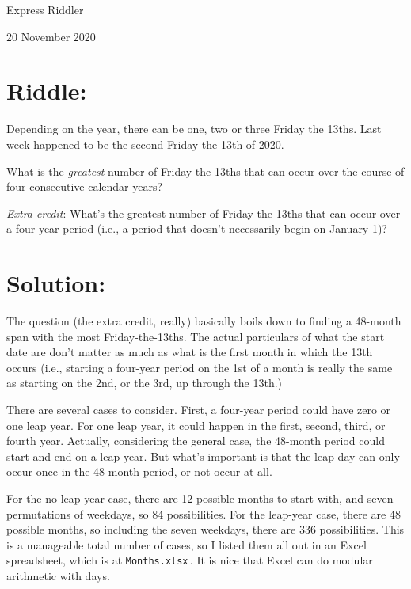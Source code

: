 \documentclass{article}
\begin{document}
\pagestyle{empty} %

\begin{center}
{\LARGE Express Riddler}

\vspace{0.15in}

{\Large 20 November 2020}
\end{center}


\section*{Riddle:}

Depending on the year, there can be one, two or three Friday the 13ths.
Last week happened to be the second Friday the 13th of 2020.

What is the \textit{greatest} number of Friday the 13ths that can occur over the course of four consecutive calendar years?

\textit{Extra credit}: What's the greatest number of Friday the 13ths that can occur over a four-year period (i.e., a period that doesn't necessarily begin on January 1)?


\section*{Solution:}

The question (the extra credit, really) basically boils down to finding a 48-month span with the most Friday-the-13ths.
The actual particulars of what the start date are don't matter as much as what is the first month in which the 13th occurs (i.e., starting a four-year period on the 1st of a month is really the same as starting on the 2nd, or the 3rd, up through the 13th.)

There are several cases to consider.
First, a four-year period could have zero or one leap year.
For one leap year, it could happen in the first, second, third, or fourth year.
Actually, considering the general case, the 48-month period could start and end on a leap year.
But what's important is that the leap day can only occur once in the 48-month period, or not occur at all.

For the no-leap-year case, there are 12 possible months to start with, and seven permutations of weekdays, so 84 possibilities.
For the leap-year case, there are 48 possible months, so including the seven weekdays, there are 336 possibilities.
This is a manageable total number of cases, so I listed them all out in an Excel spreadsheet, which is at \texttt{Months.xlsx}\,.
It is nice that Excel can do modular arithmetic with days.
\end{document}
